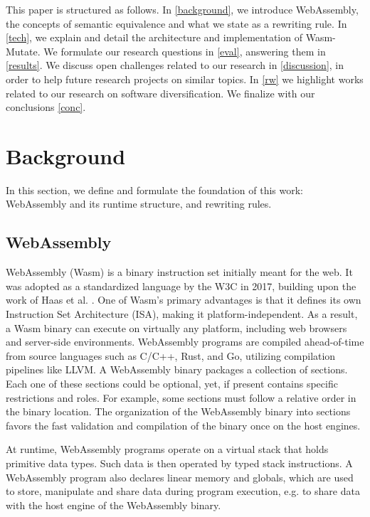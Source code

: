 \documentclass[a4paper,fleqn]{cas-dc}
\newcommand{\tool}{{\sc Wasm-Mutate}\xspace}
\newcommand{\Wasm}{WebAssembly\xspace}
\begin{document}
This paper is structured as follows. 
In \autoref{background}, we introduce WebAssembly, the concepts of semantic equivalence and what we state as a rewriting rule.
In \autoref{tech}, we explain and detail the architecture and implementation of \tool.
We formulate our research questions in \autoref{eval}, answering them in \autoref{results}.
We discuss open challenges related to our research in \autoref{discussion}, in order to help future research projects on similar topics.
In \autoref{rw} we highlight works related to our research on software diversification.
We finalize with our conclusions \autoref{conc}.

\section{Background}
\label{background}

In this section, we define and formulate the foundation of this work: WebAssembly and its runtime structure, and rewriting rules.

\subsection{WebAssembly}

WebAssembly (Wasm) is a binary instruction set initially  meant for the web. 
It was adopted as a standardized language by the W3C in 2017, building upon the work of Haas et al. \cite{haas2017bringing}. One of Wasm's primary advantages is that it defines its own Instruction Set Architecture (ISA), making it platform-independent. 
As a result, a Wasm binary can execute on virtually any platform, including web browsers and server-side environments. 
WebAssembly programs are compiled ahead-of-time from source languages such as C/C++, Rust, and Go, utilizing compilation pipelines like LLVM. 
A \Wasm binary packages a collection of sections.
Each one of these sections could be optional, yet, if present contains specific restrictions and roles.
For example, some sections must follow a relative order in the binary location.
The organization of the \Wasm binary into sections favors the fast validation and compilation of the binary once on the host engines.


At runtime, WebAssembly programs operate on a virtual stack that holds primitive data types.
Such data is then operated by typed stack instructions.
A WebAssembly program also declares linear memory and globals, which are used to store, manipulate and share data during program execution, e.g. to share data with the host engine of the WebAssembly binary.
\end{document}
